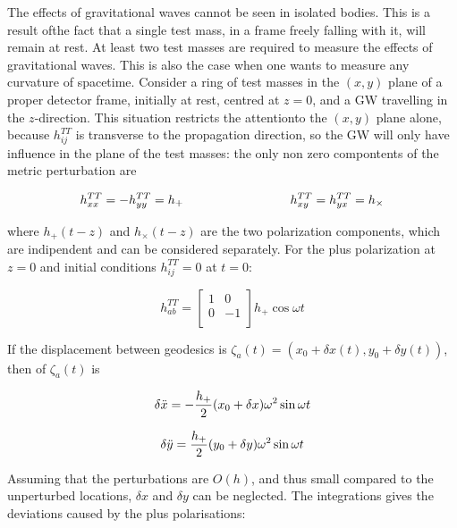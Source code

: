 \documentclass[binding=0.6cm, LaM]{sapthesis}
\begin{document}
	The effects of gravitational waves cannot be seen in isolated bodies. 
	This is a result ofthe fact that a single test mass, in a frame freely falling with it, 
	will remain at rest. At least two test masses are required to measure the effects of gravitational waves. 
	This is also the case when one wants to measure any curvature of spacetime.
	Consider a ring of test masses in the $(x, y)$ plane of a proper detector frame, initially at rest, centred at $z = 0$, 
	and a GW travelling in the $z$-direction.
	This situation restricts the attentionto the $(x,y)$ plane alone, because $h_{ij}^{TT}$ is transverse to the propagation direction, 
	so the GW will only have influence in the plane of the test masses:
	the only non zero compontents of the metric perturbation are

		\begin{equation}
		h_{xx}^{TT} = - h_{yy}^{TT} = h_{+} \hspace*{3cm} h_{xy}^{TT} = h_{yx}^{TT} = h_{\times}
		\end{equation}

	where $h_{+}(t-z)$ and $h_{\times}(t-z)$ are the two polarization components, which are indipendent and can be considered separately.
	For the plus polarization at $z=0$ and initial conditions $h_{ij}^{TT} = 0$ at $t=0$:

		\begin{equation}
		h_{ab}^{TT} = 
		\begin{bmatrix}
		1  & 0 \\
		0 &  -1 \\
		\end{bmatrix} 
		h_{+}\cos \omega t
		\end{equation}

	If the displacement between geodesics is $\zeta_a (t) = (x_0 + \delta x(t), y_0 + \delta y(t))$, then of $\zeta_a (t)$ is

		\begin{equation}
		\delta {\ddot x} = - {{h_{+}} \over 2} (x_0 + \delta x) \omega ^2 \sin \omega t
		\end{equation}

		\begin{equation}
		\delta {\ddot y} =  {{h_{+}} \over 2} (y_0 + \delta y) \omega ^2 \sin \omega t
		\end{equation}

	Assuming that the perturbations are $O(h)$, and thus small compared to the unperturbed locations, $\delta x$ and $\delta y$ can be neglected.
	The integrations gives the deviations caused by the plus polarisations:
\end{document}
